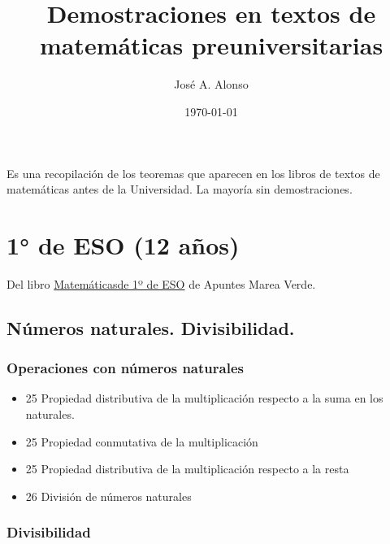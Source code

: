 \documentclass[a4paper,12pt,twoside]{book}
\author{José A. Alonso}
\date{\today}
\title{Demostraciones en textos de matemáticas preuniversitarias}
\theoremstyle{teorema}
\theoremstyle{remark}
\begin{document}
\maketitle
\tableofcontents

Es una recopilación de los teoremas que aparecen en los libros de textos
de matemáticas antes de la Universidad. La mayoría sin demostraciones.

\chapter{1° de ESO (12 años)}
\label{sec:org475c81c}

Del libro \href{http://www.apuntesmareaverde.org.es/grupos/mat/LOMLOE/1ESO/1ESO.pdf}{Matemáticasde 1º de ESO} de Apuntes Marea Verde.

\section{Números naturales. Divisibilidad.}
\label{sec:org66dc40a}

\subsection{Operaciones con números naturales}
\label{sec:org235d1c9}

\begin{itemize}
\item 25 Propiedad distributiva de la multiplicación respecto a la suma en los naturales.

\item 25 Propiedad conmutativa de la multiplicación

\item 25 Propiedad distributiva de la multiplicación respecto a la resta

\item 26 División de números naturales
\end{itemize}

\subsection{Divisibilidad}
\label{sec:org8810e99}
\end{document}
